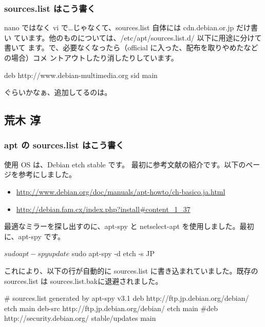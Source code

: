 \documentclass[mingoth,a4paper]{jsarticle}
\begin{document}
\subsubsection{sources.list はこう書く}

nano ではなく vi で…じゃなくて、sources.list 自体には cdn.debian.or.jp だけ書い
ています。他のものについては、/etc/apt/sources.list.d/ 以下に用途に分けて書いて
ます。で、必要なくなったら（official に入った、配布を取りやめたなどの場合）コメ
ントアウトしたり消したりしています。

\begin{commandline}
deb http://www.debian-multimedia.org sid main
\end{commandline} 
ぐらいかなぁ、追加してるのは。

\subsection{荒木 淳}

\subsubsection{apt の sources.list はこう書く}

使用 OS は、Debian etch stable です。
最初に参考文献の紹介です。以下のページを参考にしました。

\begin{itemize}
 \item   \url{http://www.debian.org/doc/manuals/apt-howto/ch-basico.ja.html}
 \item  \url{http://debian.fam.cx/index.php?install#content_1_37}
\end{itemize}

最適なミラーを探し出すのに、apt-spy と netselect-apt を使用しました。最初に、apt-spy です。

\begin{commandline}

 $ sudo apt-spy update
 $ sudo apt-spy -d etch -s JP
\end{commandline}

これにより、以下の行が自動的に sources.list に書き込まれていました。既存の sources.list は
sources.list.bakに退避されました。

\begin{commandline}
 # sources.list generated by apt-spy v3.1
 deb http://ftp.jp.debian.org/debian/ etch main
 deb-src http://ftp.jp.debian.org/debian/ etch main
 #deb http://security.debian.org/ stable/updates main
\end{commandline}
\end{document}
